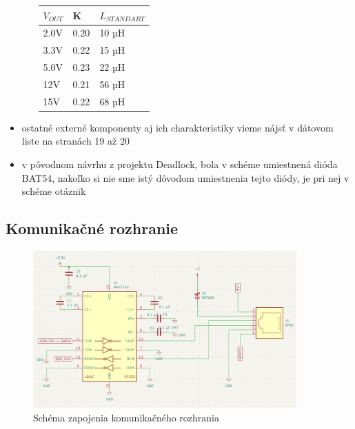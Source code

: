 \documentclass[12pt, twoside]{book}
\begin{document}
\begin{itemize}
\begin{itemize}
    \begin{longtable}[]{@{}lll@{}}
    \toprule\noalign{}
    $V_{OUT}$ & K & $L_{STANDART}$ \\
    \midrule\noalign{}
    \endhead
    \bottomrule\noalign{}
    \endlastfoot
    2.0V & 0.20 & 10 µH \\
    3.3V & 0.22 & 15 µH \\
    5.0V & 0.23 & 22 µH \\
    12V & 0.21 & 56 µH \\
    15V & 0.22 & 68 µH \\
    \end{longtable}
  \end{itemize}
\item
  ostatné externé komponenty aj ich charakteristiky vieme nájsť v
  dátovom liste na stranách 19 až 20
  \item 
  v pôvodnom návrhu z projektu Deadlock, bola v schéme umiestnená dióda BAT54, nakoľko si nie sme istý dôvodom umiestnenia tejto diódy, je pri nej v schéme otáznik 
\end{itemize}

\subsection*{Komunikačné rozhranie}

\begin{figure}[!h]
    \centerline{\includegraphics[width=0.9\textwidth]{rs-232_schematic.png}}
    \caption{Schéma zapojenia komunikačného rozhrania}
    \label{obr:shc1}
\end{figure}
\end{document}
